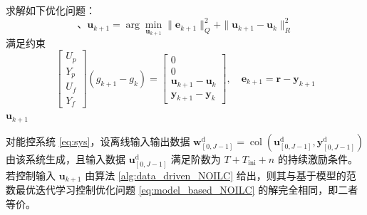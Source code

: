 \begin{algorithm}[H]
	\small
	\SetAlgoLined
	\caption{数据驱动范数最优迭代学习控制}
	\label{alg:data_driven_NOILC}
	求解如下优化问题：
	\begin{equation}、
		\mathbf{u}_{k+1} = \arg \min_{\mathbf{u}_{k+1}} \|\mathbf{e}_{k+1}\|_Q^2 + \|\mathbf{u}_{k+1} - \mathbf{u}_k\|_R^2
		\label{eq:opt_noilc}
	\end{equation}
	满足约束
	\begin{equation}
		\begin{bmatrix} U_p \\ Y_p \\ U_f \\ Y_f \end{bmatrix} (g_{k+1}-g_k) = \begin{bmatrix} 0\\ 0 \\ \mathbf{u}_{k+1} - \mathbf{u}_k \\ \mathbf{y}_{k+1} - \mathbf{y}_k \end{bmatrix}, \quad \mathbf{e}_{k+1} = \mathbf{r} - \mathbf{y}_{k+1}
		\label{eq:constraint_noilc}
	\end{equation}
	\Return $\mathbf{u}_{k+1}$
\end{algorithm}
\begin{lemma}
	对能控系统 \eqref{eq:sys}，设离线输入输出数据 \(\mathbf{w}^{\mathrm{d}}_{[0,J-1]} = \operatorname{col}(\mathbf{u}^{\mathrm{d}}_{[0,J-1]}, \mathbf{y}^{\mathrm{d}}_{[0,J-1]})\) 由该系统生成，且输入数据 \(\mathbf{u}^{\mathrm{d}}_{[0,J-1]}\) 满足阶数为 \(T+T_{\mathrm{ini}}+n\) 的持续激励条件。若控制输入 \(\mathbf{u}_{k+1}\) 由算法 \ref{alg:data_driven_NOILC} 给出，则其与基于模型的范数最优迭代学习控制优化问题 \eqref{eq:model_based_NOILC} 的解完全相同，即二者等价。
	\label{lem:noilc_equivalence}
\end{lemma}

